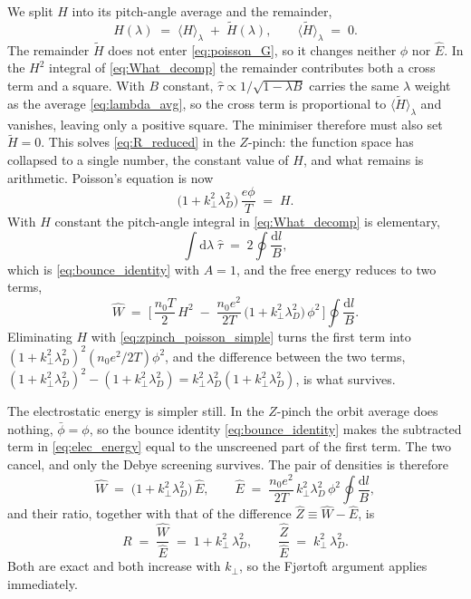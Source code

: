 \documentclass{jpp}
\newcommand{\rmd}{\text{d}}
\newcommand{\kperp}{k_\perp}
\newcommand{\lambdaD}{\lambda_D}
\newcommand{\Zhat}{\hat{Z}}
\newcommand{\lavg}[1]{\langle #1 \rangle_\lambda}
\begin{document}
We split $H$ into its pitch-angle average and the remainder,
\begin{equation}\label{eq:zpinch_H_split}
H(\lambda) \;=\; \lavg{H} \;+\; \tilde H(\lambda),
\qquad \lavg{\tilde H} \;=\; 0 .
\end{equation}
The remainder $\tilde H$ does not enter \cref{eq:poisson_G}, so it changes neither $\phi$ nor $\hat E$. In the $H^2$ integral of \cref{eq:What_decomp} the remainder contributes both a cross term and a square. With $B$ constant, $\hat\tau \propto 1/\sqrt{1-\lambda B}$ carries the same $\lambda$ weight as the average \cref{eq:lambda_avg}, so the cross term is proportional to $\lavg{\tilde H}$ and vanishes, leaving only a positive square. The minimiser therefore must also set $\tilde H = 0$. This solves \cref{eq:R_reduced} in the $Z$-pinch: the function space has collapsed to a single number, the constant value of $H$, and what remains is arithmetic. Poisson's equation is now
\begin{equation}\label{eq:zpinch_poisson_simple}
\bigl(1 + \kperp^2\lambdaD^2\bigr)\,\frac{e\phi}{T} \;=\; H .
\end{equation}
With $H$ constant the pitch-angle integral in \cref{eq:What_decomp} is elementary,
\begin{equation}
\int \rmd\lambda\; \hat\tau \;=\; 2\oint\frac{\rmd l}{B} ,
\end{equation}
which is \cref{eq:bounce_identity} with $A = 1$, and the free energy reduces to two terms,
\begin{equation}\label{eq:What_zpinch_intermediate}
\hat W \;=\; \biggl[\, \frac{n_0 T}{2}\,H^2 \;-\; \frac{n_0 e^2}{2 T}\,\bigl(1 + \kperp^2\lambdaD^2\bigr)\,\phi^2 \,\biggr] \oint\!\frac{\rmd l}{B} .
\end{equation}
Eliminating $H$ with \cref{eq:zpinch_poisson_simple} turns the first term into $(1+\kperp^2\lambdaD^2)^2 (n_0e^2/2T)\phi^2$, and the difference between the two terms, $(1+\kperp^2\lambdaD^2)^2 - (1+\kperp^2\lambdaD^2) = \kperp^2\lambdaD^2(1+\kperp^2\lambdaD^2)$, is what survives.

The electrostatic energy is simpler still. In the $Z$-pinch the orbit average does nothing, $\bar\phi = \phi$, so the bounce identity \cref{eq:bounce_identity} makes the subtracted term in \cref{eq:elec_energy} equal to the unscreened part of the first term. The two cancel, and only the Debye screening survives. The pair of densities is therefore
\begin{equation}\label{eq:What_zpinch}
\hat W \;=\; \bigl(1 + \kperp^2\lambdaD^2\bigr)\,\hat E,
\qquad
\hat E \;=\; \frac{n_0 e^2}{2 T}\,\kperp^2\lambdaD^2\,\phi^2 \oint\!\frac{\rmd l}{B},
\end{equation}
and their ratio, together with that of the difference $\Zhat \equiv \hat W - \hat E$, is
\begin{equation}\label{eq:enstrophy_ratio}
R \;=\; \frac{\hat W}{\hat E} \;=\; 1 + \kperp^2\,\lambdaD^2 ,
\qquad
\frac{\Zhat}{\hat E} \;=\; \kperp^2\,\lambdaD^2 .
\end{equation}
Both are exact and both increase with $\kperp$, so the Fj\o rtoft argument applies immediately.
\end{document}
